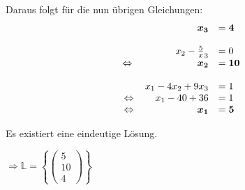 Daraus folgt für die nun übrigen Gleichungen:
\begin{equation*}
  \begin{array}{ c r l }
    & \boldsymbol{x_{3}} & = \boldsymbol{4}\\
    &  & \\
    & x_{2} -\frac{5} x_{3} & =0\ \\
    \Leftrightarrow \  & \boldsymbol{x_{2}} & = \boldsymbol{10}\\
    &  & \\
    & x_{1} -4x_{2} +9x_{3} & =1\\
    \Leftrightarrow  & x_{1} -40+36 & =1\\
    \Leftrightarrow  & \boldsymbol{x_{1}} & = \boldsymbol{5}
  \end{array}
\end{equation*}

Es existiert eine eindeutige Lösung.

$\displaystyle \Rightarrow \mathbb{L} =\left\{\begin{pmatrix}
  5\\
  10\\
  4
\end{pmatrix}\right\}$